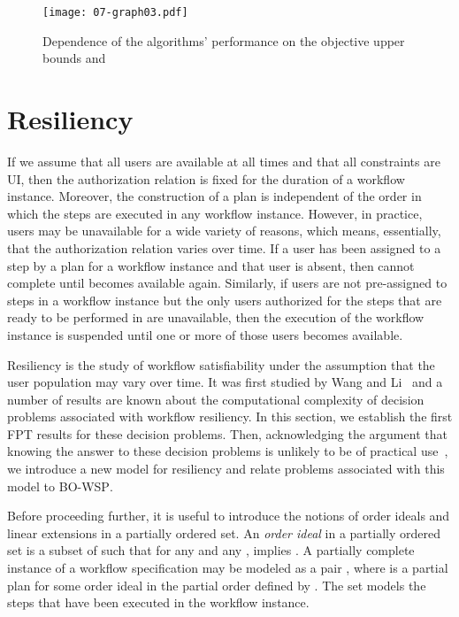 \documentclass[jcs,crcready]{iosart1c}
\newcommand{\BOWSP}{\textsc{BO-WSP}\xspace}
\begin{document}
\begin{figure}[h]\centering
	\texttt{[image: 07-graph03.pdf]}
	
\caption{Dependence of the algorithms' performance on the objective upper bounds  and }\label{fig:scaling-b}
\end{figure}


\section{Resiliency}\label{sec:resiliency}

If we assume that all users are available at all times and that all constraints are UI, then the authorization relation  is fixed for the duration of a workflow instance.
Moreover, the construction of a plan is independent of the order in which the steps are executed in any workflow instance.  
However, in practice, users may be unavailable for a wide variety of reasons, which means, essentially, that the authorization relation varies over time.
If a user  has been assigned to a step  by a plan  for a workflow instance  and that user is absent, then  cannot complete until  becomes available again.
Similarly, if users are not pre-assigned to steps in a workflow instance  but the only users authorized for the steps that are ready to be performed in  are unavailable, then the execution of the workflow instance is suspended until one or more of those users becomes available.

Resiliency is the study of workflow satisfiability under the assumption that the user population may vary over time.
It was first studied by Wang and Li~\cite{WaLi10} and a number of results are known about the computational complexity of decision problems associated with workflow resiliency.
In this section, we establish the first FPT results for these decision problems.
Then, acknowledging the argument that knowing the answer to these decision problems is unlikely to be of practical use~\cite{MaMoMo14}, we introduce a new model for resiliency and relate problems associated with this model to \BOWSP.

Before proceeding further, it is useful to introduce the notions of order ideals and linear extensions in a partially ordered set.
An \emph{order ideal}  in a partially ordered set  is a subset of  such that for any  and any ,  implies .  
A partially complete instance of a workflow specification  may be modeled as a pair , where  is a partial plan  for some order ideal  in the partial order defined by .  
The set  models the steps that have been executed in the workflow instance. 
\end{document}
